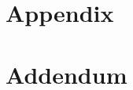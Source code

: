 \documentclass[11pt,a4paper]{article}
\begin{document}


%


\pagebreak


%

\tableofcontents
\pagebreak

\listoffigures

\listoftables
\pagebreak






\printbibliography



\section*{Appendix}



\pagebreak

\section*{Addendum}
\end{document}
